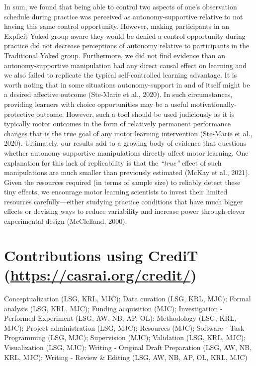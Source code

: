 \documentclass[
  english,
  man,floatsintext]{apa7}
\begin{document}
In sum, we found that being able to control two aspects of one's observation schedule during practice was perceived as autonomy-supportive relative to not having this same control opportunity. However, making participants in an Explicit Yoked group aware they would be denied a control opportunity during practice did not decrease perceptions of autonomy relative to participants in the Traditional Yoked group. Furthermore, we did not find evidence than an autonomy-supportive manipulation had any direct causal effect on learning and we also failed to replicate the typical self-controlled learning advantage. It is worth noting that in some situations autonomy-support in and of itself might be a desired affective outcome (Ste-Marie et al., 2020). In such circumstances, providing learners with choice opportunities may be a useful motivationally-protective outcome. However, such a tool should be used judiciously as it is typically motor outcomes in the form of relatively permanent performance changes that is the true goal of any motor learning intervention (Ste-Marie et al., 2020). Ultimately, our results add to a growing body of evidence that questions whether autonomy-supportive manipulations directly affect motor learning. One explanation for this lack of replicability is that the \emph{``true''} effect of such manipulations are much smaller than previously estimated (McKay et al., 2021). Given the resources required (in terms of sample size) to reliably detect these tiny effects, we encourage motor learning scientists to invest their limited resources carefully---either studying practice conditions that have much bigger effects or devising ways to reduce variability and increase power through clever experimental design (McClelland, 2000).

\vfill

\hypertarget{contributions-using-credit-httpscasrai.orgcredit}{%
\section{\texorpdfstring{Contributions using CrediT (\url{https://casrai.org/credit/})}{Contributions using CrediT (https://casrai.org/credit/)}}\label{contributions-using-credit-httpscasrai.orgcredit}}

Conceptualization (LSG, KRL, MJC); Data curation (LSG, KRL, MJC); Formal analysis (LSG, KRL, MJC); Funding acquisition (MJC); Investigation - Performed Experiment (LSG, AW, NB, AP, OL); Methodology (LSG, KRL, MJC); Project administration (LSG, MJC); Resources (MJC); Software - Task Programming (LSG, MJC); Supervision (MJC); Validation (LSG, KRL, MJC); Visualization (LSG, MJC); Writing - Original Draft Preparation (LSG, AW, NB, KRL, MJC); Writing - Review \& Editing (LSG, AW, NB, AP, OL, KRL, MJC)
\end{document}

